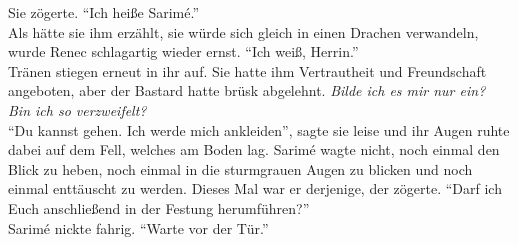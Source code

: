 Sie zögerte. ``Ich heiße Sarimé.''\\
Als hätte sie ihm erzählt, sie würde sich gleich in einen Drachen verwandeln, wurde Renec 
schlagartig wieder ernst. ``Ich weiß, Herrin.''\\
Tränen stiegen erneut in ihr auf. Sie hatte ihm Vertrautheit und Freundschaft angeboten, aber der 
Bastard hatte brüsk abgelehnt. \textit{Bilde ich es mir nur ein? Bin ich so verzweifelt?}\\
``Du kannst gehen. Ich werde mich ankleiden'', sagte sie leise und ihr Augen ruhte dabei auf 
dem Fell, welches am Boden lag. Sarimé wagte nicht, noch einmal den Blick zu heben, noch einmal in 
die sturmgrauen Augen zu blicken und noch einmal enttäuscht zu werden. Dieses Mal war er derjenige, 
der zögerte. ``Darf ich Euch anschließend in der Festung herumführen?''\\
Sarimé nickte fahrig. ``Warte vor der Tür.''\\


